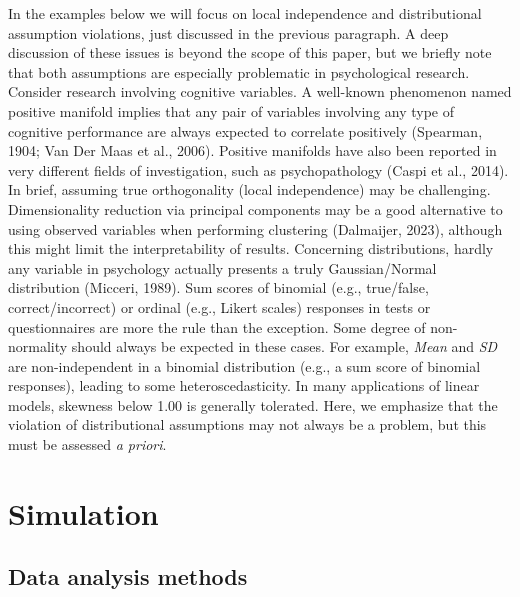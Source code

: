 \documentclass[
  man,floatsintext]{apa7}
\begin{document}
In the examples below we will focus on local independence and distributional assumption violations, just discussed in the previous paragraph. A deep discussion of these issues is beyond the scope of this paper, but we briefly note that both assumptions are especially problematic in psychological research. Consider research involving cognitive variables. A well-known phenomenon named positive manifold implies that any pair of variables involving any type of cognitive performance are always expected to correlate positively (Spearman, 1904; Van Der Maas et al., 2006). Positive manifolds have also been reported in very different fields of investigation, such as psychopathology (Caspi et al., 2014). In brief, assuming true orthogonality (local independence) may be challenging. Dimensionality reduction via principal components may be a good alternative to using observed variables when performing clustering (Dalmaijer, 2023), although this might limit the interpretability of results. Concerning distributions, hardly any variable in psychology actually presents a truly Gaussian/Normal distribution (Micceri, 1989). Sum scores of binomial (e.g., true/false, correct/incorrect) or ordinal (e.g., Likert scales) responses in tests or questionnaires are more the rule than the exception. Some degree of non-normality should always be expected in these cases. For example, \emph{Mean} and \emph{SD} are non-independent in a binomial distribution (e.g., a sum score of binomial responses), leading to some heteroscedasticity. In many applications of linear models, skewness below 1.00 is generally tolerated. Here, we emphasize that the violation of distributional assumptions may not always be a problem, but this must be assessed \emph{a priori}.

\hypertarget{simulation}{%
\section{Simulation}\label{simulation}}

\hypertarget{data-analysis-methods}{%
\subsection{Data analysis methods}\label{data-analysis-methods}}
\end{document}
